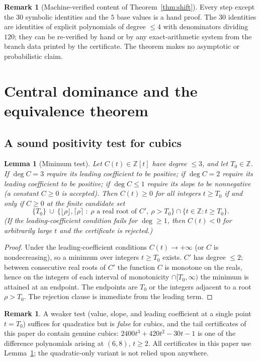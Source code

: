 \documentclass[11pt,reqno]{article}
\newtheorem{lemma}[theorem]{Lemma}
\theoremstyle{definition}
\newtheorem{remark}[theorem]{Remark}
\begin{document}
\begin{remark}[Machine-verified content of Theorem~\ref{thm:shift}]
Every step except the $30$ symbolic identities and the $5$ base values is a hand proof. The $30$ identities are identities of explicit polynomials of degree $\le4$ with denominators dividing $120$; they can be re-verified by hand or by any exact-arithmetic system from the branch data printed by the certificate. The theorem makes no asymptotic or probabilistic claim.
\end{remark}

\section{Central dominance and the equivalence theorem}\label{sec:cubic}

\subsection{A sound positivity test for cubics}
\begin{lemma}[Minimum test]\label{lem:cubic}
Let $C(t)\in\mathbb Z[t]$ have degree $\le 3$, and let $T_0\in\mathbb Z$. If $\deg C=3$ require its leading coefficient to be positive; if $\deg C=2$ require its leading coefficient to be positive; if $\deg C\le1$ require its slope to be nonnegative (a constant $C\ge0$ is accepted). Then $C(t)\ge0$ for all integers $t\ge T_0$ if and only if $C\ge0$ at the finite candidate set
\[
\{T_0\}\ \cup\ \bigl\{\lfloor\rho\rfloor,\lceil\rho\rceil\;:\;\rho \text{ a real root of } C',\ \rho> T_0\bigr\}\cap\{t\in\mathbb Z:t\ge T_0\}.
\]
(If the leading-coefficient condition fails for $\deg\ge1$, then $C(t)<0$ for arbitrarily large $t$ and the certificate is rejected.)
\end{lemma}
\begin{proof}
Under the leading-coefficient conditions $C(t)\to+\infty$ (or $C$ is nondecreasing), so a minimum over integers $t\ge T_0$ exists. $C'$ has degree $\le2$; between consecutive real roots of $C'$ the function $C$ is monotone on the reals, hence on the integers of each interval of monotonicity $\cap[T_0,\infty)$ the minimum is attained at an endpoint. The endpoints are $T_0$ or the integers adjacent to a root $\rho>T_0$. The rejection clause is immediate from the leading term.
\end{proof}

\begin{remark}\label{rem:cubic-history}
A weaker test (value, slope, and leading coefficient at a single point $t=T_0$) suffices for quadratics but is \emph{false} for cubics, and the tail certificates of this paper do contain genuine cubics: $2400t^3+420t^2-30t-1$ is one of the difference polynomials arising at $(6,8)$, $t\ge2$. All certificates in this paper use Lemma~\ref{lem:cubic}; the quadratic-only variant is not relied upon anywhere.
\end{remark}
\end{document}
